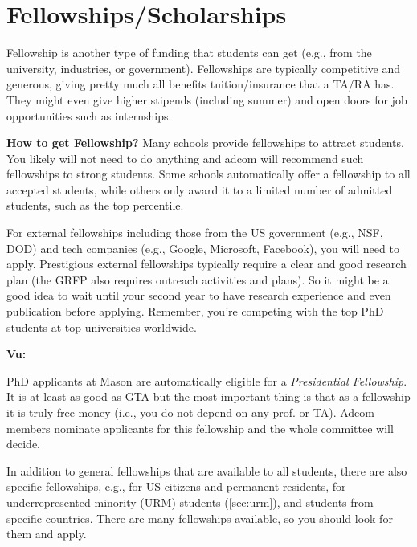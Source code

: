\documentclass[oneside,11pt,dvipsnames]{book}
\newenvironment{commentbox}[1][]{
  \small
  \begin{mybox}
    {\small \textbf{#1}}
  }{
  \end{mybox}
}
\begin{document}
\section{Fellowships/Scholarships}\label{sec:fellowships}

Fellowship is another type of funding that students can get (e.g., from the university, industries, or government).
Fellowships are typically competitive and generous, giving pretty much all benefits tuition/insurance that a TA/RA has.  They might even give higher stipends (including summer) and open doors for job opportunities such as internships.

\textbf{How to get Fellowship?}   Many schools provide fellowships to attract students. You likely will not need to do anything and adcom will recommend such fellowships to strong students. Some schools automatically offer a fellowship to all accepted students, while others only award it to a limited number of admitted students, such as the top percentile.

For external fellowships including those from the US government (e.g., NSF, DOD) and tech companies (e.g., Google, Microsoft, Facebook), you will need to apply.  %
Prestigious external fellowships typically require a clear and good research plan (the GRFP also requires  outreach activities and plans). So it might be a good idea to wait until your second year to have research experience and even publication before applying. Remember, you're competing with the top PhD students at top universities worldwide.

\begin{commentbox}[Vu:]
  PhD applicants at Mason are automatically eligible for a \emph{Presidential Fellowship}.  It is at least as good as GTA but the most important thing is that as a fellowship it is truly free money (i.e., you do not depend on any prof. or TA).  Adcom members nominate applicants for this fellowship and the whole committee will decide.
\end{commentbox}

In addition to general fellowships that are available to all students, there are also specific fellowships, e.g., for US citizens and permanent residents, for underrepresented minority (URM) students (\autoref{sec:urm}), and students from specific countries. There are many fellowships available, so you should look for them and apply.
\end{document}
